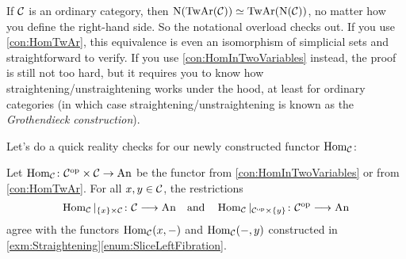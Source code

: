 \begin{rem}\label{rem:TwAr}
	If $\mathcal{C}$ is an ordinary category, then $\operatorname{N}(\operatorname{TwAr}(\mathcal{C}))\simeq \operatorname{TwAr}(\operatorname{N}(\mathcal{C}))$, no matter how you define the right-hand side. So the notational overload checks out. If you use \cref{con:HomTwAr}, this equivalence is even an isomorphism of simplicial sets and straightforward to verify. If you use \cref{con:HomInTwoVariables} instead, the proof is still not too hard, but it requires you to know how straightening/unstraightening works under the hood, at least for ordinary categories (in which case straightening/unstraightening is known as the \emph{Grothendieck construction}). 
\end{rem}
Let's do a quick reality checks for our newly constructed functor $\operatorname{Hom}_{\mathcal{C}}$:
\begin{lem}\label{lem:HomRealityCheck}
	Let $\operatorname{Hom}_{\mathcal{C}}\colon \mathcal{C}^{\mathrm{op}}\times\mathcal{C}\rightarrow\mathrm{An}$ be the functor from \cref{con:HomInTwoVariables} or from \cref{con:HomTwAr}. For all $x,y\in\mathcal{C}$, the restrictions
	\begin{equation*}
		\operatorname{Hom}_{\mathcal{C}}|_{\{x\}\times\mathcal{C}}\colon \mathcal{C}\longrightarrow\mathrm{An}\quad\text{and}\quad \operatorname{Hom}_{\mathcal{C}}|_{\mathcal{C}^{\mathrm{op}}\times\{y\}}\colon \mathcal{C}^{\mathrm{op}}\longrightarrow \mathrm{An}
	\end{equation*}
	agree with the functors $\operatorname{Hom}_{\mathcal{C}}(x,-)$ and $\operatorname{Hom}_{\mathcal{C}}(-,y)$ constructed in \cref{exm:Straightening}\cref{enum:SliceLeftFibration}.
\end{lem}
